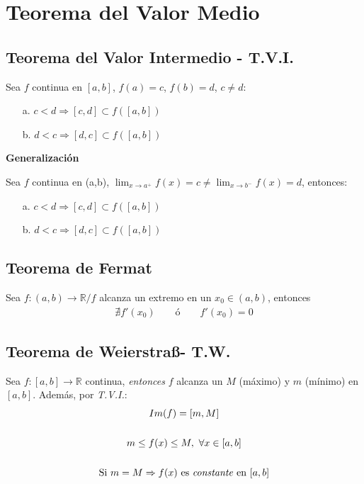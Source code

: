 \documentclass[11pt,titlepage]{article}
\newcommand{\commLim}[2]{\lim_{#1 \to #2}}
\newcommand{\littleTitle}[1]{
	\noindent \ignorespaces
	\small \textbf{#1} \normalsize
	\ignorespaces \ignorespacesafterend
}
\begin{document}
\vspace{1.5cm}
\section{Teorema del Valor Medio}

\subsection{Teorema del Valor Intermedio - T.V.I.}
Sea $f$ continua en $[a,b]$, $f(a) = c$, $f(b) = d$, $c \neq d$:
\begin{itemize}
	\item[a.] $c < d \Rightarrow [c,d] \subset f\left([a,b]\right)$
	\item[b.] $d < c \Rightarrow [d,c] \subset f\left([a,b]\right)$
\end{itemize}
\littleTitle{Generalización}\par
Sea $f$ continua en (a,b), $\commLim{x}{a^{+}} f(x) = c \neq \commLim{x}{b^{-}} f(x) = d$, entonces:
\begin{itemize}
	\item[a.] $c < d \Rightarrow [c,d] \subset f\left([a,b]\right)$
	\item[b.] $d < c \Rightarrow [d,c] \subset f\left([a,b]\right)$
\end{itemize}

\subsection{Teorema de Fermat}
Sea $f: (a,b) \to \mathbb{R} / f$ alcanza un extremo en un $x_0 \in (a,b)$, entonces
\begin{gather}
	\nexists f'(x_0) \qquad \text{ó} \qquad f'(x_0) = 0
\end{gather}

\subsection{Teorema de Weierstra\ss - T.W.}
\begin{commBoxy}
	Sea $f: [a,b] \to \mathbb{R}$ continua, \emph{entonces} $f$ alcanza un $M$ (máximo) y $m$ (mínimo) en $[a,b]$.
	Además, por \emph{T.V.I.}:
	\begin{gather*}
		Im(f) = [m,M] \\ \\
		m \leq f(x) \leq M, \ \forall x \in [a,b] \\ \\
		\text{Si } m = M \Rightarrow f(x) \text{ es \emph{constante} en } [a,b]
	\end{gather*}
\end{commBoxy}
\end{document}
